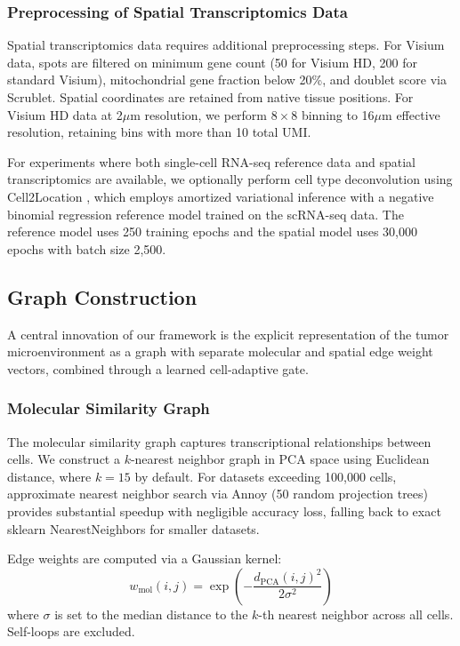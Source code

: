 \documentclass{article}
\begin{document}
\subsubsection{Preprocessing of Spatial Transcriptomics Data}

Spatial transcriptomics data requires additional preprocessing steps. For Visium data, spots are filtered on minimum gene count (50 for Visium HD, 200 for standard Visium), mitochondrial gene fraction below 20\%, and doublet score via Scrublet. Spatial coordinates are retained from native tissue positions. For Visium HD data at 2$\mu$m resolution, we perform $8 \times 8$ binning to 16$\mu$m effective resolution, retaining bins with more than 10 total UMI.

For experiments where both single-cell RNA-seq reference data and spatial transcriptomics are available, we optionally perform cell type deconvolution using Cell2Location \citep{kleshchevnikov2022cell2location}, which employs amortized variational inference with a negative binomial regression reference model trained on the scRNA-seq data. The reference model uses 250 training epochs and the spatial model uses 30,000 epochs with batch size 2,500.

\subsection{Graph Construction}

A central innovation of our framework is the explicit representation of the tumor microenvironment as a graph with separate molecular and spatial edge weight vectors, combined through a learned cell-adaptive gate.

\subsubsection{Molecular Similarity Graph}

The molecular similarity graph captures transcriptional relationships between cells. We construct a $k$-nearest neighbor graph in PCA space using Euclidean distance, where $k = 15$ by default. For datasets exceeding 100,000 cells, approximate nearest neighbor search via Annoy (50 random projection trees) provides substantial speedup with negligible accuracy loss, falling back to exact sklearn NearestNeighbors for smaller datasets.

Edge weights are computed via a Gaussian kernel:
\begin{equation}
w_{\text{mol}}(i,j) = \exp\left(-\frac{d_{\text{PCA}}(i,j)^2}{2\sigma^2}\right)
\end{equation}
where $\sigma$ is set to the median distance to the $k$-th nearest neighbor across all cells. Self-loops are excluded.
\end{document}
